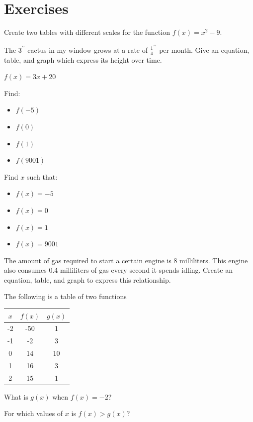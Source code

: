 

\section*{Exercises}

\begin{exercise}
	Create two tables with different scales for the function $f(x) = x^2 - 9$.
\end{exercise}
\bigskip

\begin{exercise}
	The $3^{\prime\prime}$ cactus in my window grows at a rate of $\frac{1}{4}^{\prime\prime}$ per month.  Give an equation, table, and graph which express its height over time.
\end{exercise}
\bigskip

\begin{exercise}

	$f(x) = 3x + 20$
	
	Find:
	\begin{itemize}
		\item $f(-5)$
		\item $f(0)$
		\item $f(1)$
		\item $f(9001)$
	\end{itemize}
	
			Find $x$ such that:
	\begin{itemize}
		\item $f(x)=-5$
		\item $f(x)=0$
		\item $f(x)=1$
		\item $f(x)=9001$
	\end{itemize}
\end{exercise}
\bigskip

\begin{exercise}

The amount of gas required to start a certain engine is 8 milliliters.  This engine also consumes 0.4 milliliters of gas every second it spends idling.  Create an equation, table, and graph to express this relationship.

\end{exercise}
\bigskip

\begin{exercise}
The following is a table of two functions

\begin{tabular}{|c|c|c|}
\hline
$x$ & $f(x)$ & $g(x)$ \\
\hline
-2 & -50 & 1\\
\hline
-1 & -2 & 3\\
\hline
0 & 14 & 10\\
\hline
1 & 16 & 3\\
\hline
2 & 15 & 1\\
\hline
\end{tabular}

What is $g(x)$ when $f(x) = -2$?

For which values of $x$ is $f(x) > g(x)$?

\end{exercise}
\bigskip

